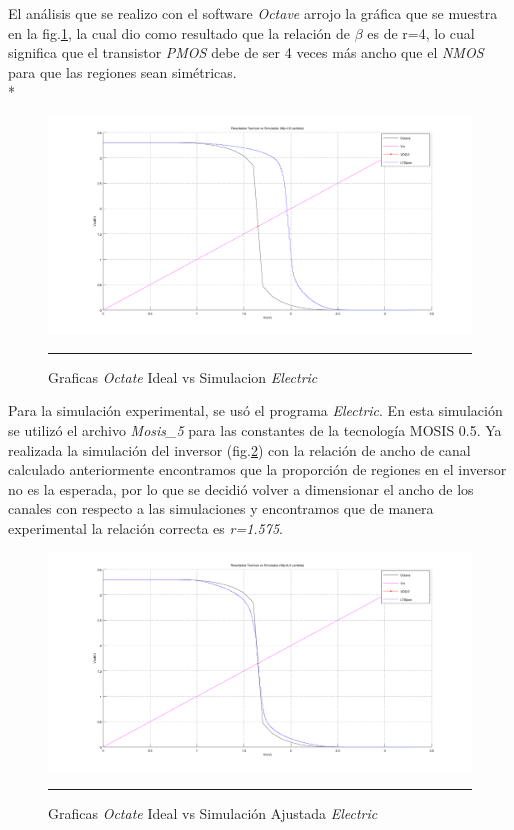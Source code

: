 \documentclass[12pt,a4paper]{article} %
\begin{document}
El análisis que se realizo con el software \textit{Octave} arrojo la gráfica que se muestra en la fig.\ref{fig:inv_est}, la cual dio como resultado que la relación de $\beta$ es de r=4, lo cual significa que el transistor \textit{PMOS} debe de ser 4 veces más ancho que el \textit{NMOS} para que las regiones sean simétricas.\\*

\begin{figure}[htbp]
  \centering
    \includegraphics[scale=0.2]{./Inv_16lam.png}
    \rule{35em}{0.5pt}
  \caption[IdealvsSim]{Graficas \textit{Octate} Ideal vs Simulacion \textit{Electric}}
  \label{fig:inv_est}
\end{figure}

Para la simulación experimental, se usó el programa \textit{Electric}. En esta simulación se utilizó el archivo \textit{Mosis\_5} para las constantes de la tecnología MOSIS 0.5. Ya realizada la simulación del inversor (fig.\ref{fig:inv_est2}) con la relación de ancho de canal calculado anteriormente encontramos que la proporción de regiones en el inversor no es la esperada, por lo que se decidió volver a dimensionar el ancho de los canales con respecto a las simulaciones y encontramos que de manera experimental la relación correcta es \textit{r=1.575}. 


\begin{figure}[htbp]
  \centering
    \includegraphics[scale=0.2]{./Inv_63lam.png}
    \rule{35em}{0.5pt}
  \caption[IdealvsSim]{Graficas \textit{Octate} Ideal vs Simulación Ajustada \textit{Electric}}
  \label{fig:inv_est2}
\end{figure}
\end{document}
